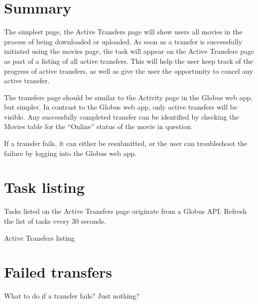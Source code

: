 
\section{Summary}

The simplest page, the Active Transfers page will show users all movies in the
process of being downloaded or uploaded. As soon as a transfer is successfully 
initiated using the movies page, the task will appear on the Active Transfers page 
as part of a listing of all active transfers. This will help the user keep track 
of the progress of active transfers, as well as give the user the opportunity to 
cancel any active transfer. 

The transfers page should be similar to the Activity page in the Globus web app, 
but simpler. In contrast to the Globus web app, only active transfers will be 
visible. Any successfully completed transfer can be identified by checking the 
Movies table for the ``Online'' status of the movie in question.

If a transfer fails, it can either be resubmitted, or the user can troubleshoot 
the failure by logging into the Globus web app.

\section{Task listing}

Tasks listed on the Active Transfers page originate from a Globus API. Refresh 
the list of tasks every 30 seconds.

\begin{table}[h]
    \caption{Active Transfers listing}
\end{table}

\section{Failed transfers}

What to do if a transfer fails? Just nothing?